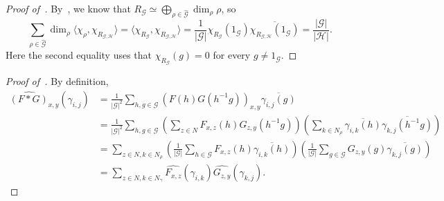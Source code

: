 \documentclass[a4paper,11pt]{article}
\theoremstyle{definition}
\newcommand{\gr}{\mathscr{G}}
\newcommand{\sgr}{\mathscr{H}}
\begin{document}
\LEsubrepresentationsrestriction*

\begin{proof}[Proof of~]
  By~, we know that $R_\gr\simeq \bigoplus_{\rho\in \widehat{\gr}} \dim_\rho \rho$, so
    \[
\sum_{\rho\in \widehat{\gr}}
\dim_\rho \langle \chi_\rho, \chi_{R_{\gr,\sgr}} \rangle = 
\langle \chi_{R_\gr}, \chi_{R_{\gr,\sgr}} \rangle = 
\frac{1}{|\gr|} \chi_{R_\gr}(1_\gr) \overline{ \chi_{R_{\gr,\sgr}}(1_\gr)}= \frac{|\gr|}{|\sgr|}.
\]
Here the second equality uses that $\chi_{R_\gr}(g)=0$ for every $g\neq 1_\gr$.
\end{proof}

\LEfourierconvolution*

\begin{proof}[Proof of~]
    By definition,
    \begin{align*}
    \widehat{(F * G)}_{x,y}(\gamma_{i,j}) & = 
    \frac{1}{|\gr|^2} 
    \sum_{h,g\in \gr}
(F(h)G(h^{-1}g))_{x,y}\overline{\gamma_{i,j}(g)}  \\ & =
    \frac{1}{|\gr|^2} 
    \sum_{h,g\in \gr}\left(
    \sum_{z\in N}
F_{x,z}(h)G_{z,y}(h^{-1}g)
\right) \left(
\sum_{k\in N_\rho} 
\overline{\gamma_{i,k}(h)} \overline{\gamma_{k,j}(h^{-1}g)} \right) 
\\ & =
    \sum_{z\in N, k\in N_\rho}
  \left(
  \frac{1}{|\gr|}
    \sum_{h\in \gr}
F_{x,z}(h)\overline{\gamma_{i,k}(h)} 
\right) \left(
  \frac{1}{|\gr|}
\sum_{g\in \gr} 
G_{z,y}(g)
\overline{\gamma_{k,j}(g)} \right)\\
& =
    \sum_{z\in N,k\in N_\gamma}
    \widehat{F_{x,z}}(\gamma_{i,k})\widehat{G_{z,y}}(\gamma_{k,j}).
    \end{align*}
\end{proof}

\LEsimilarrepresentations*
\end{document}
